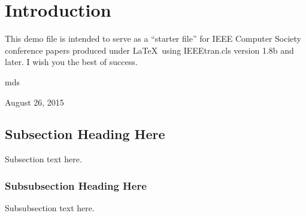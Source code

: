 \documentclass[conference,compsoc]{IEEEtran}
\begin{document}




\maketitle

\begin{abstract}
The abstract goes here.
\end{abstract}





%
\IEEEpeerreviewmaketitle



\section{Introduction}
This demo file is intended to serve as a ``starter file''
for IEEE Computer Society conference papers produced under \LaTeX\ using
IEEEtran.cls version 1.8b and later.
I wish you the best of success.

\hfill mds
 
\hfill August 26, 2015

\subsection{Subsection Heading Here}
Subsection text here.


\subsubsection{Subsubsection Heading Here}
Subsubsection text here.
\end{document}
